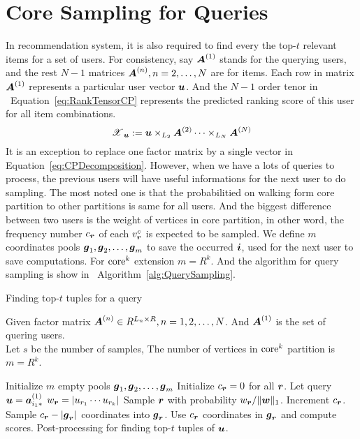 \documentclass[letterpaper]{article}
\newcommand{\T}[1]{\boldsymbol{\mathscr{{#1}}}}
\newcommand{\V}[1]{{\bm{{\MakeLowercase{#1}}}}}
\newcommand{\VnC}[3]{\V{#1}^{(#2)}_{#3}}
\newcommand{\M}[1]{{\bm{{\MakeUppercase{#1}}}}}
\newcommand{\Mn}[2]{\M{#1}^{(#2)}}
\newcommand{\norm}[2]{\|#1\|_{#2}}
\newcommand{\Eqn}[1]   {Equation~\ref{eq:#1}}
\newcommand{\Alg}[1] {Algorithm~\ref{alg:#1}}
\begin{document}
\section{Core Sampling for Queries}
In recommendation system,
it is also required to find every the top-$t$ relevant items for a set of users.
For consistency,
say $\M{A}^{(1)}$ stands for the querying users,
and the rest $N-1$ matrices $\M{A}^{(n)},n=2,\ldots,N$ are for items.
Each row in matrix $\M{A}^{(1)}$ represents a particular user vector $\V{u}$.
And the $N-1$ order tenor in ~\Eqn{RankTensorCP}
represents the predicted ranking score of this user for all item combinations.
\begin{equation}\label{eq:RankTensorCP}
\T{X}_{\V{u}} := \V{u}\times_{L_2}\Mn{A}{2}\cdots\times_{L_N}\Mn{A}{N}
\end{equation}
It is an exception to replace one factor matrix by a single vector in \Eqn{CPDecomposition}.
However, when we have a lots of queries to process,
the previous users will have useful informations for the next user to do sampling.
The most noted one is that
the probabilitied on walking form core partition to other partitions is same for all users.
And the biggest difference between two users is the weight of vertices in core partition,
in other word,
the frequency number $c_{\V{r}}$ of each $v^c_{\V{r}}$ is expected to be sampled.
We define $m$ coordinates pools $\V{g}_1,\V{g}_2,\ldots,\V{g}_{m}$ to save the occurred $\V{i}$,
used for the next user to save computations.
For ${\rm core}^k$ extension $m = R^k$.
And the algorithm for query sampling is show in ~\Alg{QuerySampling}.

\begin{algorithm}[ht]
    \caption{Finding top-$t$ tuples for a query}
    \label{alg:QuerySampling}
        Given factor matrix $\M{A}^{(n)}\in R^{L_n\times R}, n = 1,2,\ldots,N$.
        And $\M{A}^{(1)}$ is the set of quering users.\\
        Let $s$ be the number of samples,
        The number of vertices in ${\rm core}^k$ partition is $m=R^k$.
    \begin{algorithmic}[1]
    \State Initialize $m$ empty pools $\V{g}_1,\V{g}_2,\ldots,\V{g}_m$
    \State Initialize $c_{\V{r}} = 0$ for all $\V{r}$.
    \State Let query $\V{u}=\VnC{a}{1}{i_1*}$
    \ForAll{$\V{r}$}
    \State $w_\V{r} = |u_{r_1}\cdots u_{r_k}|$
    \EndFor
    \State Sample $\V{r}$ with probability $w_\V{r}/\norm{\V{W}}{1}$.
    \label{line:Indexes}
    \State  Increment $c_{\V{r}}$.
    \EndFor
    \ForAll {$\V{r}$}
    \If {$c_\V{r} > |\V{g}_\V{r}|$ }
    \State Sample $c_{\V{r}} - |\V{g}_{\V{r}}|$ coordinates into $\V{g}_{\V{r}}$.
    \EndIf
    \State Use $c_{\V{r}}$ coordinates in $\V{g}_{\V{r}}$ and compute scores.
    \EndFor
    \State Post-processing for finding top-$t$ tuples of $\V{u}$.
    \EndFor
    \end{algorithmic}
\end{algorithm}
\end{document}
